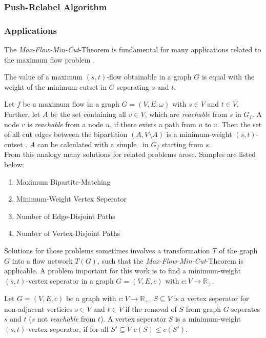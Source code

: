 

\subsubsection{Push-Relabel Algorithm}
\label{sec:push_relabel}

\subsubsection{Applications}
\label{sec:applications}

The \emph{Max-Flow-Min-Cut}-Theorem is fundamental for many applications related to the maximum
flow problem \cite{ford1956maximal}.

\begin{theorem}
The value of a maximum $(s,t)$-flow obtainable in a graph $G$ is equal with the weight
of the minimum cutset in $G$ seperating $s$ and $t$.
\end{theorem}

Let $f$ be a maximum flow in a graph $G = (V,E,\omega)$ with $s \in V$ and $t \in V$. 
Further, let $A$ be the set containing all $v \in V$, which are \emph{reachable} from $s$
in $G_f$. A node $v$ is \emph{reachable} from a node $u$, if there exists a path from $u$
to $v$. Then the set of all cut edges between the bipartition $(A,V\setminus A)$ 
is a minimum-weight $(s,t)$-cutset \cite{ford2015flows}. $A$ can be calculated with a simple \BFS~in $G_f$ starting
from $s$. \\
From this analogy many solutions for related problems arose. Samples are listed below:
\begin{enumerate}
\item Maximum Bipartite-Matching
\item Minimum-Weight Vertex Seperator
\item Number of Edge-Disjoint Paths
\item Number of Vertex-Disjoint Paths
\end{enumerate}
Solutions for those problems sometimes involves a transformation $T$ of the graph $G$
into a flow network $T(G)$, such that the \emph{Max-Flow-Min-Cut}-Theorem is applicable. 
A problem important for this work is to find a minimum-weight $(s,t)$-vertex seperator
in a graph $G = (V,E,c)$ with $c: V \rightarrow \mathbb{R}_+$.

\begin{definition}
Let $G = (V,E,c)$ be a graph with $c: V \rightarrow \mathbb{R}_+$. $S \subseteq V$
is a vertex seperator for non-adjacent verticies $s \in V$ and $t \in V$ if the
removal of $S$ from graph $G$ seperates $s$ and $t$ ($s$ not \emph{reachable} from $t$).
A vertex seperator $S$ is a minimum-weight $(s,t)$-vertex seperator, if for all $S' \subseteq V$
$c(S) \le c(S')$.
\end{definition}


